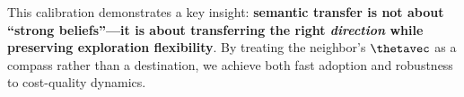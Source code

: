 This calibration demonstrates a key insight: \textbf{semantic transfer is not about ``strong beliefs''---it is about transferring the right \textit{direction} while preserving exploration flexibility}. By treating the neighbor's $\thetavec$ as a compass rather than a destination, we achieve both fast adoption and robustness to cost-quality dynamics.

